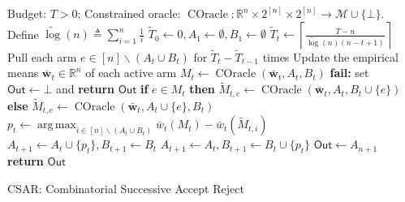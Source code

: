 \documentclass{article}
\newcommand{\AlgorithmBud}{{\small \textsf{CSAR}}\xspace}
\newcommand{\M}{\mathcal M}
\newcommand{\del}{\backslash}
\newcommand{\RR}{\mathbb R}
\DeclareMathOperator*{\argmax}{arg\,max}
\DeclareMathOperator{\COracle}{COracle}
\newcommand{\out}{\mathsf{Out}}
\newcommand{\barlog}{\tilde{\log}}
\renewcommand{\vec}[1]{\boldsymbol{#1}}
\begin{document}
\begin{algorithm}[htbp]
{
\small
\begin{algorithmic}[1]
\Require Budget: $T>0$; Constrained oracle: $\COracle: \RR^n\times 2^{[n]} \times 2^{[n]} \rightarrow \M \cup \{\bot\}$.
\State Define $\barlog(n) \triangleq \sum_{i=1}^n \frac1i$
\State $\tilde T_0 \gets 0, A_1 \gets \emptyset, B_1\gets \emptyset$
	\State $\tilde T_t \gets \left\lceil \frac{T-n}{\barlog(n)(n-t+1)} \right\rceil$
	\State Pull each arm $e\in [n]\del (A_t\cup B_t)$ for $\tilde T_t - \tilde T_{t-1}$ times
	\State Update the empirical means $\vec {\bar w}_t\in \RR^n$ of each active arm
	\State $M_t \gets \COracle(\vec {\bar w}_t, A_t, B_t)$
    \State \textbf{fail:} set $\out\gets \bot$ and \textbf{return }$\out$
  \EndIf
	\For{\textbf{each} $e \in [n]\del (A_t\cup B_t)$}
		\State \textbf{if } {$e\in M_t$} \textbf{then }  $\tilde M_{t,e} \gets \COracle(\vec {\bar w}_t, A_t, B_t \cup \{e\})$
		\State \textbf{else} $\tilde M_{t,e} \gets \COracle(\vec {\bar w}_t, A_t \cup \{e\}, B_t)$
	\EndFor
	\State $p_t \gets \argmax_{i\in[n]\del (A_t\cup B_t)} \bar w_t(M_t) - \bar w_t(\tilde M_{t,i})$
		\State $A_{t+1} \gets A_t \cup \{p_t\}, B_{t+1} \gets B_t$
	\Else
		\State $A_{t+1} \gets A_t , B_{t+1} \gets B_t \cup \{p_t\}$
	\EndIf
\EndFor
\State $\out\gets A_{n+1}$
\State \textbf{return} $\out$
\end{algorithmic}
\caption{\AlgorithmBud: Combinatorial Successive Accept Reject}
\label{algo:budget}
}
\end{algorithm}
\vspace{-0.5em}
\end{document}
